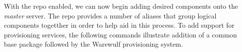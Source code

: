 With the \FSP{} repo enabled, we can now begin adding desired components onto the
{\em master} server. The \FSP{} repo provides a number of aliases that group
logical components togetther in order to help aid in this process. To add
support for provisioning services, the following commands illustrate addition
of a common base package followed by the Warewulf provisioning system.
